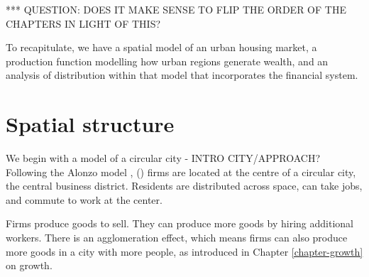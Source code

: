 *** QUESTION: DOES IT MAKE SENSE TO FLIP THE ORDER OF THE CHAPTERS IN LIGHT OF THIS? 


To recapitulate, we have a spatial model of an urban housing market, a production function modelling how urban regions generate wealth, and an analysis of distribution within that model that incorporates the financial system.

\section{Spatial structure}


We begin with a model of a circular city - INTRO CITY/APPROACH?
Following the \gls{Alonzo model} \cite{alonzoTheoryUrbanLand1960}, (\cite{alonsoLocationLandUse1964}) firms are located at the centre of a circular city, the central business district. Residents are distributed across space, can take jobs, and commute to work at the center. 

Firms produce goods to sell. They can produce more goods by hiring additional workers. 
There is an agglomeration effect, which means firms can also produce more goods %
in a city with more people, as introduced in Chapter \ref{chapter-growth} on growth.

